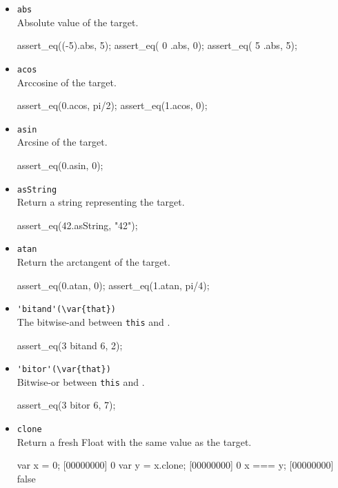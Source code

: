 \begin{itemize}
\item \lstinline|abs|\\
  Absolute value of the target.
\begin{urbiscript}
assert_eq((-5).abs, 5);
assert_eq(  0 .abs, 0);
assert_eq(  5 .abs, 5);
\end{urbiscript}

\item \lstinline|acos|\\
  Arccosine of the target.
\begin{urbiscript}
assert_eq(0.acos, pi/2);
assert_eq(1.acos, 0);
\end{urbiscript}

\item \lstinline|asin|\\
  Arcsine of the target.
\begin{urbiscript}
assert_eq(0.asin, 0);
\end{urbiscript}

\item \lstinline|asString|\\
  Return a string representing the target.
\begin{urbiscript}
assert_eq(42.asString, "42");
\end{urbiscript}

\item \lstinline|atan|\\
  Return the arctangent of the target.
\begin{urbiscript}
assert_eq(0.atan, 0);
assert_eq(1.atan, pi/4);
\end{urbiscript}

\item \lstinline|'bitand'(\var{that})|\\
  The bitwise-and between \lstinline|this| and .
\begin{urbiscript}
assert_eq(3 bitand 6, 2);
\end{urbiscript}

\item \lstinline|'bitor'(\var{that})|\\
  Bitwise-or between \lstinline|this| and .
\begin{urbiscript}
assert_eq(3 bitor 6, 7);
\end{urbiscript}

\item \lstinline|clone|\\
  Return a fresh Float with the same value as the target.
\begin{urbiscript}
var x = 0;
[00000000] 0
var y = x.clone;
[00000000] 0
x === y;
[00000000] false
\end{urbiscript}


\end{itemize}
